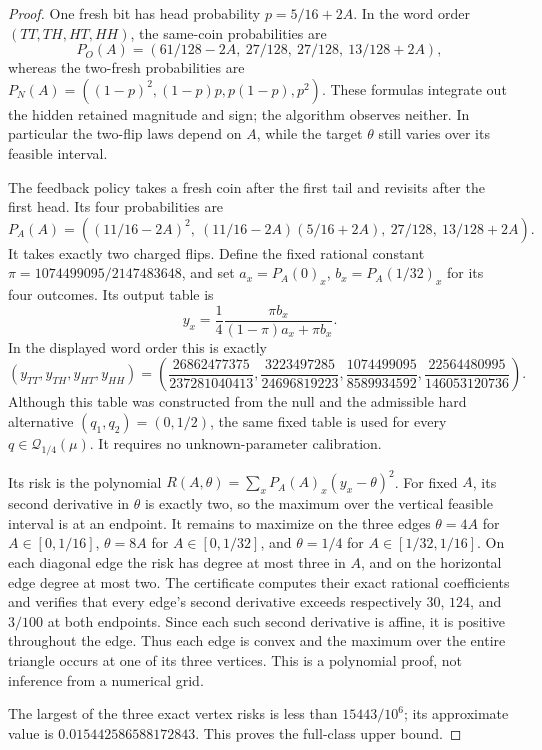\begin{proof}
One fresh bit has head probability $p=5/16+2A$.
In the word order $(TT,TH,HT,HH)$, the same-coin probabilities are
\[
 P_O(A)=(61/128-2A,\ 27/128,\ 27/128,\ 13/128+2A),
\]
whereas the two-fresh probabilities are
$P_N(A)=((1-p)^2,(1-p)p,p(1-p),p^2)$.
These formulas integrate out the hidden retained magnitude and sign;
the algorithm observes neither. In particular the two-flip laws depend
on $A$, while the target $\theta$ still varies over its feasible interval.

The feedback policy takes a fresh coin after the first tail and revisits
after the first head. Its four probabilities are
\[
 P_A(A)=((11/16-2A)^2,\ (11/16-2A)(5/16+2A),\
                       27/128,\ 13/128+2A).
\]
It takes exactly two charged flips. Define the fixed rational constant
$\pi=1074499095/2147483648$, and set
$a_x=P_A(0)_x$, $b_x=P_A(1/32)_x$ for its four outcomes. Its output table is
\[
 y_x=\frac14\frac{\pi b_x}{(1-\pi)a_x+\pi b_x}.
\]
In the displayed word order this is exactly
\[
 (y_{TT},y_{TH},y_{HT},y_{HH})=
 \left(\frac{26862477375}{237281040413},
       \frac{3223497285}{24696819223},
       \frac{1074499095}{8589934592},
       \frac{22564480995}{146053120736}\right).
\]
Although this table was constructed from the null and the admissible hard
alternative $(q_1,q_2)=(0,1/2)$, the same fixed table is used for every
$q\in\mathcal Q_{1/4}(\mu)$. It requires no unknown-parameter calibration.

Its risk is the polynomial
$R(A,\theta)=\sum_x P_A(A)_x(y_x-\theta)^2$.
For fixed $A$, its second derivative in $\theta$ is exactly two, so the
maximum over the vertical feasible interval is at an endpoint. It remains
to maximize on the three edges $\theta=4A$ for $A\in[0,1/16]$,
$\theta=8A$ for $A\in[0,1/32]$, and
$\theta=1/4$ for $A\in[1/32,1/16]$.
On each diagonal edge the risk has degree at most three in $A$, and on the
horizontal edge degree at most two. The certificate computes their exact
rational coefficients and verifies that every edge's second derivative
exceeds respectively $30$, $124$, and $3/100$ at both endpoints.
Since each such second derivative
is affine, it is positive throughout the edge. Thus each edge is convex
and the maximum over the entire triangle occurs at one of its three vertices.
This is a polynomial proof, not inference from a numerical grid.

The largest of the three exact vertex risks is less than $15443/10^6$;
its approximate value is $0.015442586588172843$. This proves the full-class
upper bound.


\end{proof}
